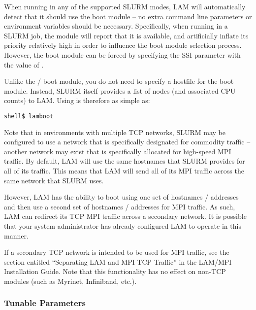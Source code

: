 When running in any of the supported SLURM modes, LAM will
automatically detect that it should use the  boot module
-- no extra command line parameters or environment variables should be
necessary.
%
Specifically, when running in a SLURM job, the  module
will report that it is available, and artificially inflate its
priority relatively high in order to influence the boot module
selection process.
%
However, the  boot module can be forced by specifying the
 SSI parameter with the value of
.

Unlike the / boot module, you do not need to specify
a hostfile for the  boot module.  Instead, SLURM itself
provides a list of nodes (and associated CPU counts) to LAM.  Using
 is therefore as simple as:

\lstset{style=lam-cmdline}
\begin{lstlisting}
shell$ lamboot
\end{lstlisting}


Note that in environments with multiple TCP networks, SLURM may be
configured to use a network that is specifically designated for
commodity traffic -- another network may exist that is specifically
allocated for high-speed MPI traffic.  By default, LAM will use the
same hostnames that SLURM provides for all of its traffic.  This means
that LAM will send all of its MPI traffic across the same network that
SLURM uses.

However, LAM has the ability to boot using one set of hostnames /
addresses and then use a second set of hostnames / addresses for MPI
traffic.  As such, LAM can redirect its TCP MPI traffic across a
secondary network.  It is possible that your system administrator has
already configured LAM to operate in this manner.

If a secondary TCP network is intended to be used for MPI traffic, see
the section entitled ``Separating LAM and MPI TCP Traffic'' in the
LAM/MPI Installation Guide.  Note that this functionality has no
effect on non-TCP  modules (such as Myrinet, Infiniband,
etc.).



\subsubsection{Tunable Parameters}

